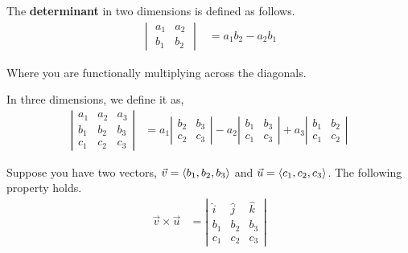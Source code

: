 \begin{definition}
    The \textbf{determinant} in two dimensions is defined as follows.
    \begin{align*}
        \begin{vmatrix}
            a_1 & a_2 \\ 
            b_1 & b_2
        \end{vmatrix} &=
        a_1 b_2 - a_2 b_1
    \end{align*}

    Where you are functionally multiplying across the diagonals.

    In three dimensions, we define it as,
    \begin{align*}
        \left| \begin{array}{ccc}
            a_1 & a_2 & a_3 \\
            b_1 & b_2 & b_3 \\
            c_1 & c_2 & c_3
        \end{array} \right| &=
        a_1 \left| \begin{array}{cc}
            b_2 & b_3 \\ 
            c_2 & c_3
        \end{array} \right| -
        a_2 \left| \begin{array}{cc}
            b_1 & b_3 \\ 
            c_1 & c_3
        \end{array} \right| +
        a_3 \left| \begin{array}{cc}
            b_1 & b_2 \\ 
            c_1 & c_2
        \end{array} \right|
    \end{align*}
\end{definition}

\begin{lemma}
    Suppose you have two vectors, $\vec{v} = \langle b_1, b_2, b_3 \rangle$ and $\vec{u} = \langle c_1, c_2, c_3 \rangle$. The following property holds.
    \begin{align*}
        \vec{v} \times \vec{u} &= 
        \left| \begin{array}{ccc}
            \hat{i} & \hat{j} & \hat{k} \\
            b_1 & b_2 & b_3 \\
            c_1 & c_2 & c_3
        \end{array} \right|
    \end{align*}
\end{lemma}